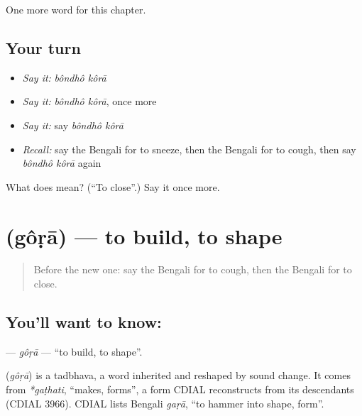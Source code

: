 \begin{grammarlens}[title={What you've built}]
One more word for this chapter.
\end{grammarlens}

\subsection*{Your turn}
\begin{itemize}
\raggedright
  \item \emph{Say it:} \emph{bôndhô kôrā}
  \item \emph{Say it:} \emph{bôndhô kôrā}, once more
  \item \emph{Say it:} say \emph{bôndhô kôrā}
  \item \emph{Recall:} say the Bengali for to sneeze, then the Bengali for to cough, then say \emph{bôndhô kôrā} again
\end{itemize}

\begin{tcolorbox}[breakable,colback=teal!4,colframe=teal!35!black,title={Before you move on}]
What does   mean? (\textquotedblleft{}To close\textquotedblright{}.) Say it once more.
\end{tcolorbox}
\section[\texorpdfstring{\bn{গড়া} (gôṛā)}{গড়া (gôṛā)}]{ (gôṛā) — to build, to shape}

\label{lesson:BN-C151-gora}



\begin{quote}
Before the new one: say the Bengali for to cough, then the Bengali for to close.
\end{quote}

\subsection*{You'll want to know: }
\textbf{} — \emph{gôṛā} — \textquotedblleft{}to build, to shape\textquotedblright{}.

\begin{cousinweb}
\textbf{} (\emph{gôṛā}) is a tadbhava, a word inherited and reshaped by sound change. It comes from \emph{*gaṭhati}, \textquotedblleft{}makes, forms\textquotedblright{}, a form CDIAL reconstructs from its descendants (CDIAL 3966). CDIAL lists Bengali \emph{gaṛā}, \textquotedblleft{}to hammer into shape, form\textquotedblright{}.
\end{cousinweb}

